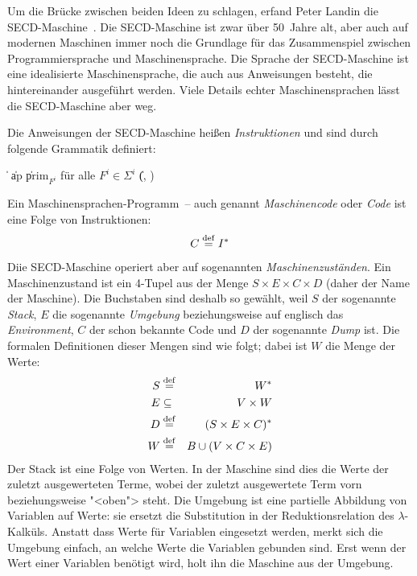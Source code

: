 Um die Brücke zwischen beiden Ideen zu schlagen, erfand Peter Landin
die SECD-Maschine~\cite{Landin1964}.  Die SECD-Maschine ist zwar über
50~Jahre alt, aber auch auf modernen Maschinen immer noch die
Grundlage für das Zusammenspiel zwischen Programmiersprache und
Maschinensprache.  Die Sprache der SECD-Maschine ist eine idealisierte
Maschinensprache, die auch aus Anweisungen besteht, die
hintereinander ausgeführt werden.  Viele Details echter
Maschinensprachen lässt die SECD-Maschine aber weg.

\begin{definition}\label{def:secd-code}
  Die Anweisungen der SECD-Maschine heißen
  \textit{Instruktionen} und sind durch folgende Grammatik definiert:
  \begin{grammar}
     \: 
    \> \| 
    \> \| ap
    \> \| prim$_{F^i}$ \textrm{für alle $F^i \in \Sigma^i$}
    \> \| (, )
  \end{grammar}
  Ein Maschinensprachen-Programm~-- auch genannt
  \textit{Maschinencode} oder
  \textit{Code} ist eine Folge von Instruktionen:
  \begin{displaymath}
    C \stackrel{\rm def}{=} I^\ast
  \end{displaymath}
\end{definition}
%
Diie SECD-Maschine operiert aber auf sogenannten
\textit{Maschinenzuständen}.  Ein Maschinenzustand ist ein 4-Tupel aus der
Menge $S\times E\times C\times D$ (daher der Name der Maschine).  Die
Buchstaben sind deshalb so gewählt, weil $S$ der sogenannte
\textit{Stack}, $E$ die sogenannte
\textit{Umgebung} beziehungsweise auf englisch das
\textit{Environment}, $C$ der schon bekannte
Code und $D$ der
sogenannte \textit{Dump} ist.  Die formalen Definitionen
dieser Mengen sind wie folgt; dabei ist $W$ die Menge der Werte:
%
\begin{eqnarray*}
  S &\stackrel{\rm def}{=}& W^\ast\\
  E &\subseteq& V\times W\\
  D &\stackrel{\rm def}{=}& (S\times E \times C)^\ast\\
  W &\stackrel{\rm def}{=}& B \cup (V\times C\times E)
\end{eqnarray*}
%
Der Stack ist eine Folge von Werten.  In der Maschine sind dies
die Werte der zuletzt ausgewerteten Terme, wobei der zuletzt
ausgewertete Term vorn beziehungsweise "<oben"> steht.  Die Umgebung ist eine
partielle Abbildung von Variablen auf Werte: sie ersetzt die
Substitution in der Reduktionsrelation des $\lambda$-Kalküls.  Anstatt
dass Werte für Variablen eingesetzt werden, merkt sich die Umgebung
einfach, an welche Werte die Variablen gebunden sind.  Erst wenn der
Wert einer Variablen benötigt wird, holt ihn die Maschine aus der
Umgebung.

